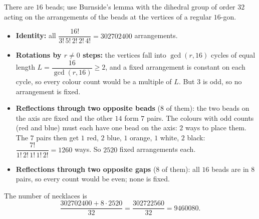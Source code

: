 There are $16$ beads; use Burnside's lemma with the dihedral group of order $32$ acting on the arrangements of the beads at the vertices of a regular $16$-gon.
\begin{itemize}
\item \textbf{Identity:} all $\dfrac{16!}{3!\,5!\,2!\,2!\,4!}=302702400$ arrangements.
\item \textbf{Rotations by $r\ne0$ steps:} the vertices fall into $\gcd(r,16)$ cycles of equal length $L=\dfrac{16}{\gcd(r,16)}\ge2$, and a fixed arrangement is constant on each cycle, so every colour count would be a multiple of $L$. But $3$ is odd, so no arrangement is fixed.
\item \textbf{Reflections through two opposite beads} ($8$ of them): the two beads on the axis are fixed and the other $14$ form $7$ pairs. The colours with odd counts (red and blue) must each have one bead on the axis: $2$ ways to place them. The $7$ pairs then get $1$ red, $2$ blue, $1$ orange, $1$ white, $2$ black: $\dfrac{7!}{1!\,2!\,1!\,1!\,2!}=1260$ ways. So $2520$ fixed arrangements each.
\item \textbf{Reflections through two opposite gaps} ($8$ of them): all $16$ beads are in $8$ pairs, so every count would be even; none is fixed.
\end{itemize}
The number of necklaces is
\[
\dfrac{302702400+8\cdot2520}{32}=\dfrac{302722560}{32}=\boxed{9460080}.
\]
